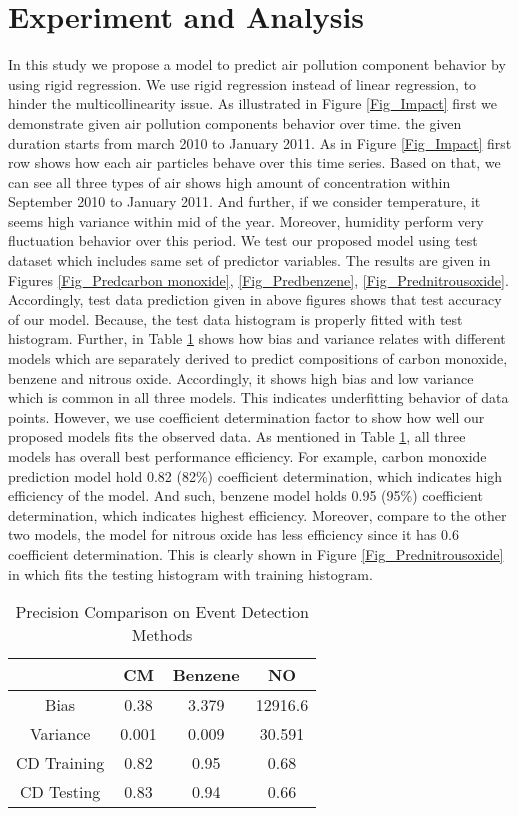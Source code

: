 \section{Experiment and Analysis} \label{sec-experiment}
In this study we propose a model to 
predict air pollution component behavior by using rigid regression. 
We use rigid regression instead of linear regression,
to hinder the multicollinearity issue. 
As illustrated in Figure \ref{Fig_Impact} first we 
demonstrate given air pollution components behavior over time.
the given duration starts from march 2010 to January 2011.
As in Figure \ref{Fig_Impact} first row shows how each 
air particles behave over this time series. 
Based on that, we can see all three types of air shows 
high amount of concentration within September 2010 to January 2011.
And further, if we consider temperature, it seems high variance within mid of the year.
Moreover, humidity perform very fluctuation behavior over this period.
We test our proposed model using test dataset which 
includes same set of predictor variables.
The results are given in Figures \ref{Fig_Predcarbon monoxide}, \ref{Fig_Predbenzene}, \ref{Fig_Prednitrousoxide}.
Accordingly, test data prediction given in above 
figures shows that test accuracy of our model. 
Because, the test data histogram is properly fitted with test histogram.
Further, in Table \ref{tbl:overall-experiments} shows how bias and variance relates with 
different models which are separately derived to 
predict compositions of carbon monoxide, benzene and nitrous oxide.
Accordingly, it shows high bias and low variance which is common in all three models.
This indicates underfitting behavior of data points.
However, we use coefficient determination factor to 
show how well our proposed models fits the observed data. 
As mentioned in Table \ref{tbl:overall-experiments}, 
all three models has overall best performance efficiency. 
For example, carbon monoxide prediction model hold 0.82 (82\%) coefficient determination, which indicates high efficiency of the model.
And such, benzene model holds 0.95 (95\%) coefficient determination, which indicates highest efficiency.
Moreover, compare to the other two models, the model for nitrous oxide has less efficiency since it has 0.6 coefficient determination. 
This is clearly shown in Figure \ref{Fig_Prednitrousoxide} in which fits the testing histogram with training histogram.

\begin{table}  \centering
  \caption{Precision Comparison on Event Detection Methods}
  \label{tbl:overall-experiments}
  \begin{tabular}{cccc}
\toprule
    & CM & Benzene &NO \\
\midrule
Bias & 0.38 & 3.379 & 12916.6 \\
Variance & 0.001 & 0.009 & 30.591 \\
CD Training & 0.82 & 0.95 & 0.68 \\
CD Testing & 0.83 & 0.94 & 0.66 \\
\bottomrule
\end{tabular}
\end{table}


